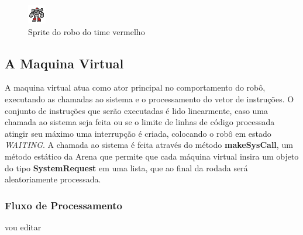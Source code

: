 \documentclass[a4paper]{article}
\begin{document}
\begin{figure}[htb]
\begin{center}
\includegraphics[scale=1]{images/roboB2.png}
\caption{Sprite do robo do time vermelho}
\end{center}
\end{figure}



\subsection{A Maquina Virtual}
A maquina virtual atua como ator principal no comportamento do robô, executando as chamadas ao sistema e o processamento do vetor de instruções. O conjunto de instruções que serão executadas é lido linearmente, caso uma chamada ao sistema seja feita ou se o limite de linhas de código processada atingir seu máximo uma interrupção é criada, colocando o robô em estado \textit{WAITING}. A chamada ao sistema é feita através do método \textbf{makeSysCall}, um método estático da Arena que permite que cada máquina virtual insira um objeto do tipo \textbf{SystemRequest} em uma lista, que ao final da rodada será aleatoriamente processada.
\subsubsection{Fluxo de Processamento}


vou editar
\end{document}
